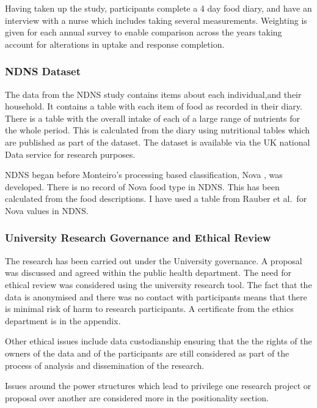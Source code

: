\documentclass[
]{article}
\begin{document}
Having taken up the study, participants complete a 4 day food diary, and
have an interview with a nurse which includes taking several
measurements. Weighting is given for each annual survey to enable
comparison across the years taking account for alterations in uptake and
response completion.

\hypertarget{ndns-dataset}{%
\subsubsection{NDNS Dataset}\label{ndns-dataset}}

The data from the NDNS study contains items about each individual,and
their household. It contains a table with each item of food as recorded
in their diary. There is a table with the overall intake of each of a
large range of nutrients for the whole period. This is calculated from
the diary using nutritional tables which are published as part of the
dataset. The dataset is available via the UK national Data service for
research purposes.

NDNS began before Monteiro's processing based classification, Nova , was
developed. There is no record of Nova food type in NDNS. This has been
calculated from the food descriptions. I have used a table from Rauber
et al.~for Nova values in NDNS.

\hypertarget{university-research-governance-and-ethical-review}{%
\subsubsection{University Research Governance and Ethical
Review}\label{university-research-governance-and-ethical-review}}

The research has been carried out under the University governance. A
proposal was discussed and agreed within the public health department.
The need for ethical review was considered using the university research
tool. The fact that the data is anonymised and there was no contact with
participants means that there is minimal risk of harm to research
participants. A certificate from the ethics department is in the
appendix.

Other ethical issues include data custodianship ensuring that the the
rights of the owners of the data and of the participants are still
considered as part of the process of analysis and dissemination of the
research.

Issues around the power structures which lead to privilege one research
project or proposal over another are considered more in the
positionality section.
\end{document}

